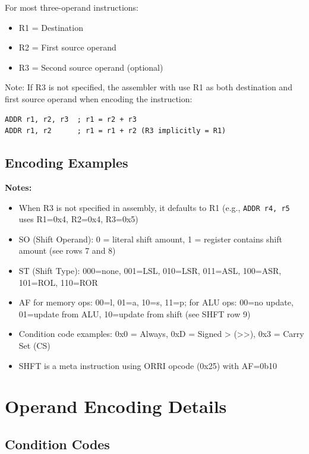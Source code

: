 For most three-operand instructions:
\begin{itemize}
	\item R1 = Destination
	\item R2 = First source operand
	\item R3 = Second source operand (optional)
\end{itemize}

Note: If R3 is not specified, the assembler with use R1 as both destination and first source operand when encoding the
instruction:

\begin{lstlisting}
ADDR r1, r2, r3  ; r1 = r2 + r3
ADDR r1, r2      ; r1 = r1 + r2 (R3 implicitly = R1)
\end{lstlisting}

\subsection{Encoding Examples}



\noindent\textbf{Notes:}
\begin{itemize}
	\item When R3 is not specified in assembly, it defaults to R1 (e.g., \texttt{ADDR r4, r5} uses R1=0x4, R2=0x4, R3=0x5)
	\item SO (Shift Operand): 0 = literal shift amount, 1 = register contains shift amount (see rows 7 and 8)
	\item ST (Shift Type): 000=none, 001=LSL, 010=LSR, 011=ASL, 100=ASR, 101=ROL, 110=ROR
	\item AF for memory ops: 00=l, 01=a, 10=s, 11=p; for ALU ops: 00=no update, 01=update from ALU, 10=update from shift (see
	      SHFT row 9)
	\item Condition code examples: 0x0 = Always, 0xD = Signed > (>>), 0x3 = Carry Set (CS)
	\item SHFT is a meta instruction using ORRI opcode (0x25) with AF=0b10
\end{itemize}

\section{Operand Encoding Details}

\subsection{Condition Codes}

